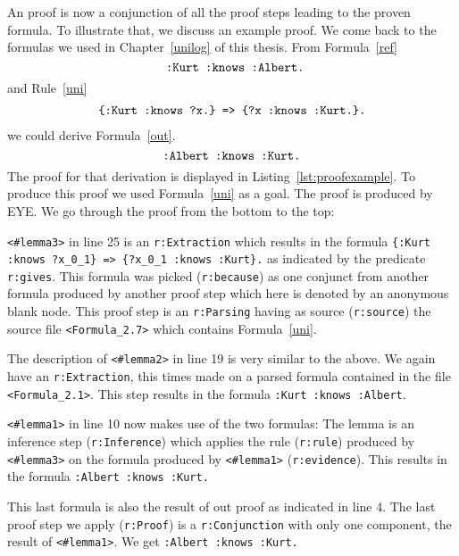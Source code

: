 An \nthree proof is now a conjunction of all the proof steps leading to the proven formula. To illustrate that, we discuss an example proof.
We come back to the formulas we used in Chapter~\ref{unilog} of this thesis. From Formula~\ref{ref}
\[
 \verb! :Kurt :knows :Albert.!
\]
and Rule~\ref{uni}
\begin{multline}\notag
 \texttt{\{:Kurt :knows ?x.\} => }%
 \texttt{\{?x :knows :Kurt.\}.}%
\end{multline}
we could derive Formula~\ref{out}.
\begin{equation}\notag
\texttt{:Albert :knows :Kurt.}
\end{equation}
The proof for that derivation is displayed in Listing~\ref{lst:proofexample}. To produce this proof we used Formula~\ref{uni} as a goal. The proof is produced by EYE.
 We go through the proof from the bottom to the top: 
 
\texttt{<\#lemma3>} in line 25 is an \texttt{r:Extraction} which results in the formula
\texttt{\{:Kurt :knows ?x\_0\_1\} => \{?x\_0\_1 :knows :Kurt\}.} as indicated by the predicate \texttt{r:gives}.
This formula was picked (\texttt{r:because}) as one conjunct from another formula produced by another proof step which here is denoted by an anonymous blank node. 
This proof step is an \texttt{r:Parsing}  
having as source  (\texttt{r:source})  the source file \texttt{<Formula\_2.7>} which  contains Formula~\ref{uni}.

The description of \texttt{<\#lemma2>} in line 19 is very similar to the above. We again have an \texttt{r:Extraction}, 
this times made on a parsed formula contained in the file \texttt{<Formula\_2.1>}. This step results in the formula \texttt{:Kurt :knows :Albert}.

\texttt{<\#lemma1>} in line 10 now makes use of the two formulas: The lemma is an inference step (\texttt{r:Inference}) which applies the rule (\texttt{r:rule})
produced by \texttt{<\#lemma3>} on the formula produced by \texttt{<\#lemma1>} (\texttt{r:evidence}). This results in the formula \texttt{:Albert :knows :Kurt.}

This last formula is also the result of out proof as indicated in line 4. The last proof step we apply (\texttt{r:Proof}) is a \texttt{r:Conjunction} with only one component, the 
result of \texttt{<\#lemma1>}. We get \texttt{:Albert :knows :Kurt.}



